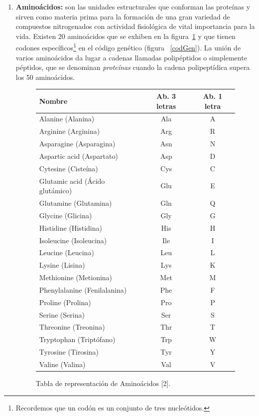 \begin{enumerate}
    \item \textbf{Aminoácidos:} son las unidades estructurales que conforman las proteínas y sirven como materia prima para la formación de una gran variedad de compuestos nitrogenados con actividad fisiológica de vital importancia para la vida. Existen 20 aminoácidos que se exhiben en la figura~\ref{aminoac} y que  tienen codones específicos\footnote{Recordemos que un codón es un conjunto de tres nucleótidos.} en el código genético (figura ~\ref{codGen}). La unión de varios aminoácidos da lugar a cadenas llamadas polipéptidos o simplemente péptidos, que se denominan \emph{proteínas} cuando la cadena polipeptídica supera los 50 aminoácidos.
    	\begin{figure}[!h]
    		\hspace*{1cm}\begin{tabular}{| l | c | c |}
				\hline
				{\bf Nombre} & {\bf Ab. 3 letras} & {\bf Ab. 1 letra} \\
				\hline
				\hline
				Alanine (Alanina) & Ala & A\\\hline
				Arginine (Arginina) & Arg & R\\\hline
				Asparagine (Asparagina) & Asn & N\\\hline
				Aspartic acid (Aspartato) & Asp & D\\\hline
				Cytesine (Cisteína) & Cys & C\\\hline
				Glutamic acid (Ácido glutámico) & Glu & E\\\hline
				Glutamine (Glutamina) & Gln & Q\\\hline
				Glycine (Glicina) & Gly & G\\\hline
				Histidine (Histidina) & His & H\\\hline
				Isoleucine (Isoleucina) & Ile & I\\\hline
				Leucine (Leucina) & Leu & L\\\hline
				Lysine (Lisina) & Lys & K\\\hline
				Methionine (Metionina) & Met & M\\\hline
				Phenylalanine (Fenilalanina) & Phe & F\\\hline
				Proline (Prolina) & Pro & P\\\hline
				Serine (Serina) & Ser & S\\\hline
				Threonine (Treonina) & Thr & T\\\hline
				Tryptophan (Triptófano) & Trp & W\\\hline
				Tyrosine (Tirosina) & Tyr & Y\\\hline
				Valine (Valina) & Val & V\\\hline										
			\end{tabular}
			\caption{Tabla de representación de Aminoácidos [2].}
			\label{DnaRna}
			\label{aminoac}
		\end{figure}


\end{enumerate}
